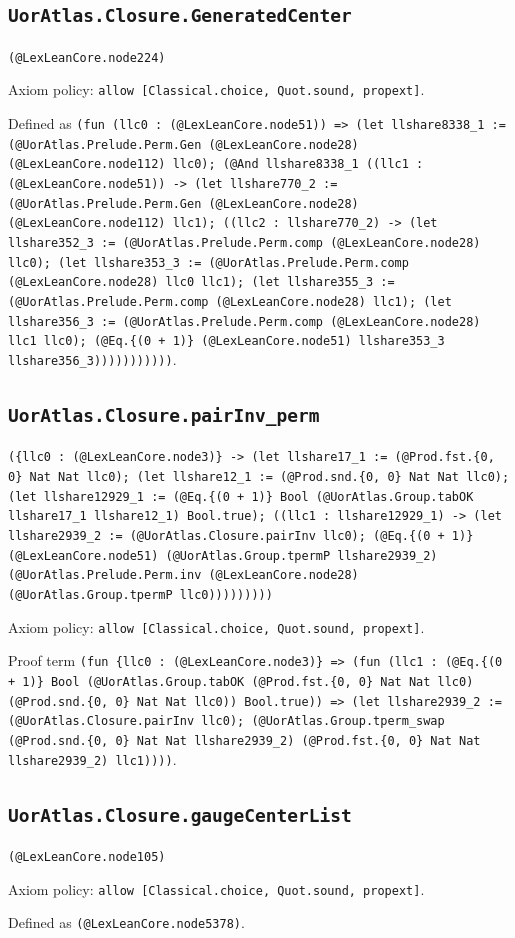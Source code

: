 \documentclass[11pt]{article}
\begin{document}
\subsection*{\texttt{UorAtlas.Closure.GeneratedCenter}}
\noindent\texttt{(@LexLeanCore.node224)}\par
\noindent Axiom policy: \texttt{allow [Classical.choice, Quot.sound, propext]}.\par
\noindent Defined as \texttt{(fun (llc0 : (@LexLeanCore.node51)) => (let llshare8338\_1 := (@UorAtlas.Prelude.Perm.Gen (@LexLeanCore.node28) (@LexLeanCore.node112) llc0); (@And llshare8338\_1 ((llc1 : (@LexLeanCore.node51)) -> (let llshare770\_2 := (@UorAtlas.Prelude.Perm.Gen (@LexLeanCore.node28) (@LexLeanCore.node112) llc1); ((llc2 : llshare770\_2) -> (let llshare352\_3 := (@UorAtlas.Prelude.Perm.comp (@LexLeanCore.node28) llc0); (let llshare353\_3 := (@UorAtlas.Prelude.Perm.comp (@LexLeanCore.node28) llc0 llc1); (let llshare355\_3 := (@UorAtlas.Prelude.Perm.comp (@LexLeanCore.node28) llc1); (let llshare356\_3 := (@UorAtlas.Prelude.Perm.comp (@LexLeanCore.node28) llc1 llc0); (@Eq.\{(0 + 1)\} (@LexLeanCore.node51) llshare353\_3 llshare356\_3)))))))))))}.\par
\subsection*{\texttt{UorAtlas.Closure.pairInv\_perm}}
\noindent\texttt{(\{llc0 : (@LexLeanCore.node3)\} -> (let llshare17\_1 := (@Prod.fst.\{0, 0\} Nat Nat llc0); (let llshare12\_1 := (@Prod.snd.\{0, 0\} Nat Nat llc0); (let llshare12929\_1 := (@Eq.\{(0 + 1)\} Bool (@UorAtlas.Group.tabOK llshare17\_1 llshare12\_1) Bool.true); ((llc1 : llshare12929\_1) -> (let llshare2939\_2 := (@UorAtlas.Closure.pairInv llc0); (@Eq.\{(0 + 1)\} (@LexLeanCore.node51) (@UorAtlas.Group.tpermP llshare2939\_2) (@UorAtlas.Prelude.Perm.inv (@LexLeanCore.node28) (@UorAtlas.Group.tpermP llc0)))))))))}\par
\noindent Axiom policy: \texttt{allow [Classical.choice, Quot.sound, propext]}.\par
\noindent Proof term \texttt{(fun \{llc0 : (@LexLeanCore.node3)\} => (fun (llc1 : (@Eq.\{(0 + 1)\} Bool (@UorAtlas.Group.tabOK (@Prod.fst.\{0, 0\} Nat Nat llc0) (@Prod.snd.\{0, 0\} Nat Nat llc0)) Bool.true)) => (let llshare2939\_2 := (@UorAtlas.Closure.pairInv llc0); (@UorAtlas.Group.tperm\_swap (@Prod.snd.\{0, 0\} Nat Nat llshare2939\_2) (@Prod.fst.\{0, 0\} Nat Nat llshare2939\_2) llc1))))}.\par
\subsection*{\texttt{UorAtlas.Closure.gaugeCenterList}}
\noindent\texttt{(@LexLeanCore.node105)}\par
\noindent Axiom policy: \texttt{allow [Classical.choice, Quot.sound, propext]}.\par
\noindent Defined as \texttt{(@LexLeanCore.node5378)}.\par
\end{document}
